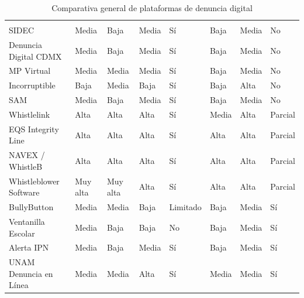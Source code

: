 
\footnotesize

\renewcommand{\arraystretch}{1.2}

\setlength{\tabcolsep}{3pt}

\begin{longtable}{|L{2.9cm}|L{1.6cm}|L{1.7cm}|L{1.75cm}|L{1.6cm}|L{1.9cm}|L{1.75cm}|L{1.75cm}|}
    \caption{Comparativa general de plataformas de denuncia digital}
    \label{tab:comparativa_plataformas} \\
    \hline
     &
     &
     &
     &
     &
     &
     &
     \\
    \hline
    \endfirsthead
    \hline
     &
     &
     &
     &
     &
     &
     &
     \\
    \hline
    \endhead
    SIDEC & Media & Baja & Media & Sí & Baja & Media & No \\ \hline
    Denuncia Digital CDMX & Media & Baja & Media & Sí & Baja & Media & No \\ \hline
    MP Virtual & Media & Media & Media & Sí & Baja & Media & No \\ \hline
    Incorruptible & Baja & Media & Baja & Sí & Baja & Alta & No \\ \hline
    SAM & Media & Baja & Media & Sí & Baja & Media & No \\ \hline
    Whistlelink & Alta & Alta & Alta & Sí & Media & Alta & Parcial \\ \hline
    EQS Integrity Line & Alta & Alta & Alta & Sí & Alta & Alta & Parcial \\ \hline
    NAVEX / WhistleB & Alta & Alta & Alta & Sí & Alta & Alta & Parcial \\ \hline
    Whistleblower Software & Muy alta & Muy alta & Alta & Sí & Alta & Alta & Parcial \\ \hline
    BullyButton & Media & Media & Baja & Limitado & Baja & Media & Sí \\ \hline
    Ventanilla Escolar & Media & Baja & Baja & No & Baja & Media & Sí \\ \hline
    Alerta IPN & Media & Baja & Media & Sí & Baja & Media & Sí \\ \hline
    UNAM Denuncia en Línea & Media & Media & Alta & Sí & Media & Media & Sí \\ \hline
\end{longtable}

